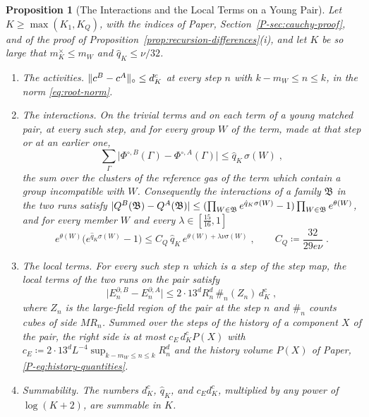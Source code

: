 \documentclass[11pt]{preprint}
\DeclarePairedDelimiter{\abs}{\lvert}{\rvert}
\DeclarePairedDelimiter{\norm}{\lVert}{\rVert}
\numberwithin{equation}{section}
\newtheorem{proposition}{Proposition}
\theoremstyle{definition}
\theoremstyle{remark}
\theoremstyle{plain}
\begin{document}
\begin{proposition}[The Interactions and the Local Terms on a Young Pair]\label{prop:young-pair-weights}
Let $K \geq \max(K_1, K_Q)$, with the indices of Paper, Section~\ref{P-sec:cauchy-proof}, and of the proof of Proposition~\ref{prop:recursion-differences}(i), and let $K$ be so large that $m^\times_K \leq m_W$ and $\hat q_K \leq \nu/32$.
\begin{enumerate}[label=(\alph*)]
\item \emph{The activities.} $\norm{c^B - c^A}_\circ \leq d^c_K$ at every step $n$ with $k - m_W \leq n \leq k$, in the norm \eqref{eq:root-norm}.
\item \emph{The interactions.} On the trivial terms and on each term of a young matched pair, at every such step, and for every group $W$ of the term, made at that step or at an earlier one,
\begin{equation}\label{eq:young-interactions}
    \sum_\Gamma\bigl\lvert\Phi^{\circ,B}(\Gamma) - \Phi^{\circ,A}(\Gamma)\bigr\rvert \leq \hat q_K\,\sigma(W)\;,
\end{equation}
the sum over the clusters of the reference gas of the term which contain a group incompatible with $W$. Consequently the interactions of a family $\mathfrak B$ in the two runs satisfy $\abs{Q^B(\mathfrak B) - Q^A(\mathfrak B)} \leq (\prod_{W \in \mathfrak B}e^{\hat q_K\sigma(W)} - 1)\prod_{W \in \mathfrak B}e^{\theta(W)}$, and for every member $W$ and every $\lambda \in [\frac{15}{16}, 1]$
\begin{equation}\label{eq:young-member}
    e^{\theta(W)}\bigl(e^{\hat q_K\sigma(W)} - 1\bigr) \leq C_Q\,\hat q_K\,e^{\theta(W) + \lambda\nu\sigma(W)}\;,
    \qquad
    C_Q \coloneqq \frac{32}{29e\nu}\;.
\end{equation}
\item \emph{The local terms.} For every such step $n$ which is a step of the step map, the local terms of the two runs on the pair satisfy
\begin{equation}\label{eq:young-local-terms}
    \bigl\lvert E^{\partial,B}_n - E^{\partial,A}_n\bigr\rvert \leq 2 \cdot 13^dR_n^d\,\#_n(Z_n)\,d^c_K\;,
\end{equation}
where $Z_n$ is the large-field region of the pair at the step $n$ and $\#_n$ counts cubes of side $MR_n$. Summed over the steps of the history of a component $X$ of the pair, the right side is at most $c_E\,d^c_KP(X)$ with $c_E \coloneqq 2 \cdot 13^dL^{-4}\sup_{k - m_W \leq n \leq k}R_n^d$ and the history volume $P(X)$ of Paper, \eqref{P-eq:history-quantities}.
\item \emph{Summability.} The numbers $d^c_K$, $\hat q_K$, and $c_Ed^c_K$, multiplied by any power of $\log(K + 2)$, are summable in $K$.
\end{enumerate}
\end{proposition}
\end{document}
